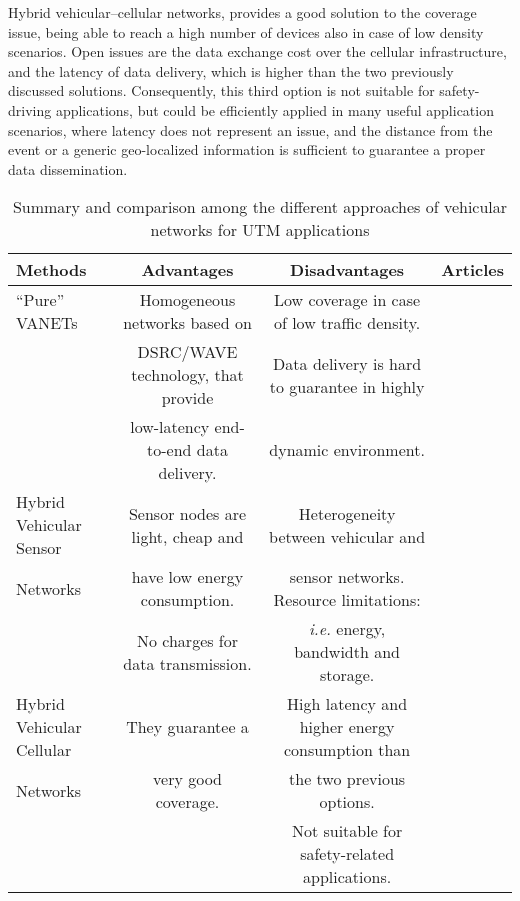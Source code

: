 \documentclass[10pt,onecolumn]{article}
\begin{document}
Hybrid vehicular--cellular networks, provides a good solution to the coverage issue, being able to reach a high number of devices also in case of low density scenarios. Open issues are the data exchange cost over the cellular infrastructure, and the latency of data delivery, which is higher than the two previously discussed solutions.
Consequently, this third option is not suitable for safety-driving applications, but could be efficiently applied in many useful application scenarios, where latency does not represent an issue, and the distance from the event or a generic geo-localized information is sufficient to guarantee a proper data dissemination.
 
\begin{table*}[ht]
\centering
\scriptsize
\caption{Summary and comparison among the different approaches of vehicular networks for UTM applications}
\label{tab:compareVANET}
\begin{tabular}{ | l | c| c| c| } 
  \hline    
  \hline      
  \textbf{Methods} & \textbf{Advantages} & \textbf{Disadvantages}  & \textbf{Articles}  \\ 
  \hline      \hline   
  ``Pure'' VANETs  & Homogeneous networks based on    & Low coverage in case of low traffic density.   & \cite{Nadeem2004, Chen2006} \\
			             & DSRC/WAVE technology, that provide 		& Data delivery is hard to guarantee in highly 		&\cite{Jerbi2007, Panichpapiboon2008}	\\
			             & low-latency end-to-end data delivery.	&  dynamic environment.			  & \cite{Garelli2011, Ma2009}  \\
  \hline 
  Hybrid Vehicular Sensor  & Sensor nodes are light, cheap and & Heterogeneity between vehicular and      & \cite{Barba2010}  \\
   	Networks      	      & have low energy consumption.	 & sensor networks. Resource limitations:         & \cite{wsn-4-its, wsn-4-its2} \\ 
					                & No charges for data transmission. &  \textit{i.e.} energy, bandwidth and storage. &	\cite{vanetWSN2, HuaQin2010}\\
   \hline 
  Hybrid Vehicular Cellular & They guarantee a 	   	& High latency and higher energy consumption than   & \cite{vanet.cell01,vanet.cell02} \\ 
	Networks	               & 	very good coverage.   & the two previous options. 			                  & \cite{Lin2006,cvis} \\
			                     & 	            	    		& Not suitable for safety-related applications. 	  & \\
   \hline
   \hline    
\end{tabular} 
\end{table*} 
\end{document}
